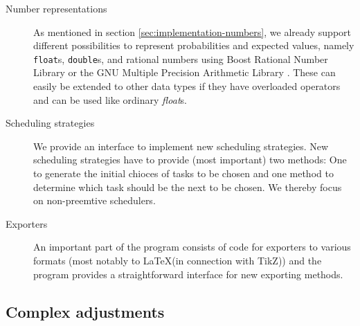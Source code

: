 \begin{description}
\item[Number representations] As mentioned in section \ref{sec:implementation-numbers}, we already support different possibilities to represent probabilities and expected values, namely \texttt{float}s, \texttt{double}s, and rational numbers using Boost Rational Number Library \cite{boostrational} or the GNU Multiple Precision Arithmetic Library \cite{gnumultiprecision}. These can easily be extended to other data types if they have overloaded operators and can be used like ordinary \emph{float}s.
\item[Scheduling strategies] We provide an interface to implement new scheduling strategies. New scheduling strategies have to provide (most important) two methods: One to generate the initial chioces of tasks to be chosen and one method to determine which task should be the next to be chosen. We thereby focus on non-preemtive schedulers.
\item[Exporters] An important part of the program consists of code for exporters to various formats (most notably to \LaTeX (in connection with TikZ)) and the program provides a straightforward interface for new exporting methods.
\end{description}

\subsection{Complex adjustments}
\label{sec:implementations-extensions-moderate}

